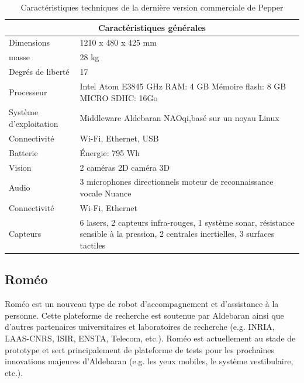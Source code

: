 \begin{table}[h]
\begin{tabular}{ | l | p{10cm} | }
	\hline
	\multicolumn{2}{|c|}{Caractéristiques générales} \\
	\hline
	Dimensions & 1210 x 480 x 425 mm \\
	\hline 
	masse & 28 kg \\
	\hline 
	Degrés de liberté  & 17 \\
	\hline
	Processeur & Intel Atom E3845 \newline 1.91 GHz \newline RAM: 4 GB \newline Mémoire flash: 8 GB \newline MICRO SDHC: 16Go  \\
	\hline
	Système d'exploitation & Middleware Aldebaran NAOqi,\newline basé sur un noyau Linux \\
	\hline
	Connectivité & Wi-Fi, Ethernet, USB \\
	\hline
	Batterie & Énergie: 795 Wh \\
	\hline 
	Vision & 2 caméras 2D \newline 1 caméra 3D \\
	\hline
	Audio & 3 microphones directionnels \newline moteur de reconnaissance vocale Nuance  \\
	\hline
	Connectivité & Wi-Fi, Ethernet \\
	\hline
	Capteurs & 6 lasers, 2 capteurs infra-rouges, 1 système sonar, résistance sensible à la pression, 2 centrales inertielles, 3 surfaces tactiles \\
	\hline
\end{tabular}
\caption[Caractéristiques technique de Pepper]{Caractéristiques techniques de la dernière version commerciale  de Pepper}
\label {tab: Caractéristiques technique de Pepper}
\cite{PepperTech}
\end{table}

\subsection{Roméo}
\label{Entreprise: Les produits: Roméo}
Roméo est un nouveau type de robot d'accompagnement et d'assistance à la personne. Cette plateforme de recherche est soutenue par Aldebaran ainsi que d'autres partenaires universitaires et laboratoires de recherche (e.g. INRIA, LAAS-CNRS, ISIR, ENSTA, Telecom, etc.). Roméo est actuellement au stade de prototype et sert principalement de plateforme de tests pour les prochaines innovations majeures d'Aldebaran (e.g. les yeux mobiles, le système vestibulaire, etc.). 

